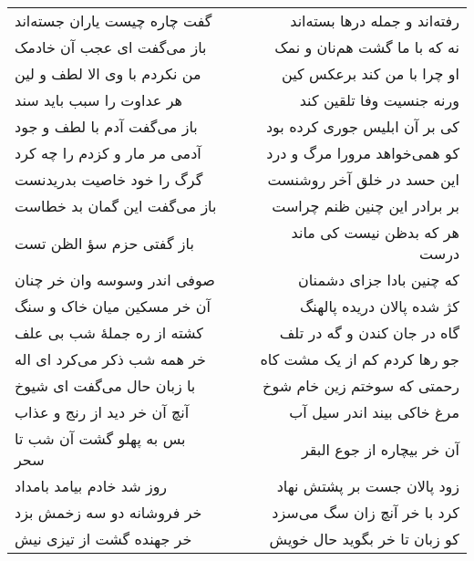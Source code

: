 \begin{center}
\begin{longtable}{l p{0.5cm} r}
گفت چاره چیست یاران جسته‌اند
&&
رفته‌اند و جمله درها بسته‌اند
\\
باز می‌گفت ای عجب آن خادمک
&&
نه که با ما گشت هم‌نان و نمک
\\
من نکردم با وی الا لطف و لین
&&
او چرا با من کند برعکس کین
\\
هر عداوت را سبب باید سند
&&
ورنه جنسیت وفا تلقین کند
\\
باز می‌گفت آدم با لطف و جود
&&
کی بر آن ابلیس جوری کرده بود
\\
آدمی مر مار و کزدم را چه کرد
&&
کو همی‌خواهد مرورا مرگ و درد
\\
گرگ را خود خاصیت بدریدنست
&&
این حسد در خلق آخر روشنست
\\
باز می‌گفت این گمان بد خطاست
&&
بر برادر این چنین ظنم چراست
\\
باز گفتی حزم سؤ الظن تست
&&
هر که بدظن نیست کی ماند درست
\\
صوفی اندر وسوسه وان خر چنان
&&
که چنین بادا جزای دشمنان
\\
آن خر مسکین میان خاک و سنگ
&&
کژ شده پالان دریده پالهنگ
\\
کشته از ره جملهٔ شب بی علف
&&
گاه در جان کندن و گه در تلف
\\
خر همه شب ذکر می‌کرد ای اله
&&
جو رها کردم کم از یک مشت کاه
\\
با زبان حال می‌گفت ای شیوخ
&&
رحمتی که سوختم زین خام شوخ
\\
آنچ آن خر دید از رنج و عذاب
&&
مرغ خاکی بیند اندر سیل آب
\\
بس به پهلو گشت آن شب تا سحر
&&
آن خر بیچاره از جوع البقر
\\
روز شد خادم بیامد بامداد
&&
زود پالان جست بر پشتش نهاد
\\
خر فروشانه دو سه زخمش بزد
&&
کرد با خر آنچ زان سگ می‌سزد
\\
خر جهنده گشت از تیزی نیش
&&
کو زبان تا خر بگوید حال خویش
\\
\end{longtable}
\end{center}
